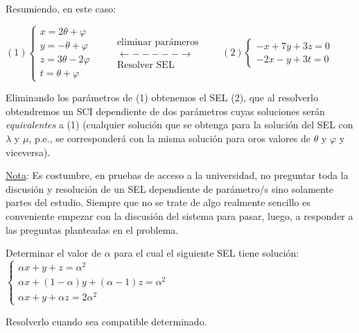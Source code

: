 \begin{proofw}
Resumiendo, en este caso:

 \noindent $(1)\begin{cases} x= 2\theta + \varphi\\y= -\theta+\varphi\\z=3\theta-2\varphi \\t=\theta+\varphi  \end{cases} \qquad       
\begin{matrix} \text{eliminar parámeros} \\ \longleftarrow -----\longrightarrow \\{\text{Resolver SEL}} \end{matrix} 
 \qquad (2)\begin{cases} -x+7y+3z=0 \\ -2x-y+3t=0 \end{cases} $
 
 Eliminando los parámetros de (1) obtenemos el SEL (2), que al resolverlo obtendremos un SCI dependiente de dos parámetros cuyas soluciones serán \textit{equivalentes} a (1) (cualquier solución que se obtenga para la solución del SEL con $\lambda$ y $\mu$, p.e., se corresponderá con la misma solución para oros valores de $\theta$ y $\varphi$ y viceversa).
 
\end{proofw}

\vspace{3mm}

\underline{Nota}: Es costumbre, en pruebas de acceso a la universidad, no preguntar toda la discusión y resolución de un SEL dependiente de parámetro/s sino solamente partes del estudio. Siempre que no se trate de algo realmente sencillo es conveniente empezar con la discusión del sistema para pasar, luego, a responder a las preguntas planteadas en el problema.

\begin{ejre}
Determinar el valor de $\alpha$ para el cual el siguiente SEL tiene solución:  $\begin{cases}	\alpha x+y+z=\alpha^2\\\alpha x+(1-\alpha)y+(\alpha-1)z=\alpha^2\\\alpha x+y+\alpha z=2\alpha^2 \end{cases}$

Resolverlo cuando sea compatible determinado.
\end{ejre}


